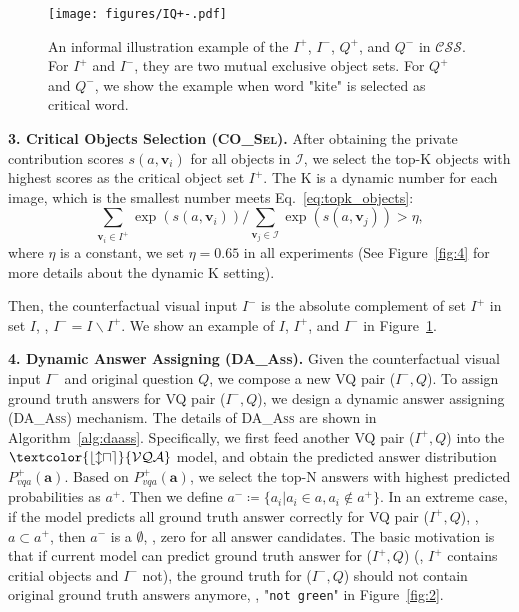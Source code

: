\documentclass[10pt,twocolumn,letterpaper]{article}
\begin{document}
\begin{figure}[tbp]
	\centering
	\texttt{[image: figures/IQ+-.pdf]}
	\vspace{-0.5em}
	\caption{An informal illustration example of the $I^+$, $I^-$, $Q^+$, and $Q^-$ in $\mathcal{CSS}$. For $I^+$ and $I^-$, they are two mutual exclusive object sets. For $Q^+$ and $Q^-$, we show the example when word "kite" is selected as critical word.
	}
	\label{fig:3}
\end{figure}


\textbf{3. Critical Objects Selection (\textsc{CO\_Sel}).} After obtaining the private contribution scores $s(a, \bm{v}_i)$ for all objects in $\mathcal{I}$, we select the top-K objects with highest scores as the critical object set $I^+$. The K is a dynamic number for each image, which is the smallest number meets Eq.~\eqref{eq:topk_objects}:
\begin{equation} \label{eq:topk_objects}
\sum_{\bm{v}_i \in I^+} \exp(s(a, \bm{v}_i)) / \sum_{\bm{v}_j \in \mathcal{I}} \exp(s(a, \bm{v}_j))  > \eta,
\end{equation}
where $\eta$ is a constant, we set $\eta=0.65$ in all experiments (See Figure~\ref{fig:4} for more details about the dynamic K setting).

Then, the counterfactual visual input $I^-$ is the absolute complement of set $I^+$ in set $I$, \ie, $I^- = I \backslash I^+$. We show an example of $I$, $I^+$, and $I^-$ in Figure~\ref{fig:3}.


\textbf{4. Dynamic Answer Assigning (\textsc{DA\_Ass}).} Given the counterfactual visual input $I^-$ and original question $Q$, we compose a new VQ pair ($I^-, Q$). To assign ground truth answers for VQ pair  ($I^-, Q$), we design a dynamic answer assigning (\textsc{DA\_Ass}) mechanism. The details of \textsc{DA\_Ass} are shown in Algorithm~\ref{alg:daass}. Specifically, we first feed another VQ pair ($I^+, Q$) into the $\mathcal{\textcolor{blue}{VQA}}$ model, and obtain the predicted answer distribution $P^+_{vqa}(\bm{a})$. Based on $P^+_{vqa}(\bm{a})$, we select the top-N answers with highest predicted probabilities as $a^+$. Then we define $ a^- \coloneqq \{a_i | a_i \in a, a_i \notin a^+ \} $. In an extreme case, if the model predicts all ground truth answer correctly for VQ pair ($I^+, Q$), \ie, $a \subset a^+$, then $a^-$ is a $\emptyset$, \ie, zero for all answer candidates. The basic motivation is that if current model can predict ground truth answer for ($I^+, Q$) (\ie, $I^+$ contains critial objects and $I^-$ not), the ground truth for ($I^-, Q$) should not contain original ground truth answers anymore, \eg, "\texttt{not green}" in Figure~\ref{fig:2}.
\end{document}
